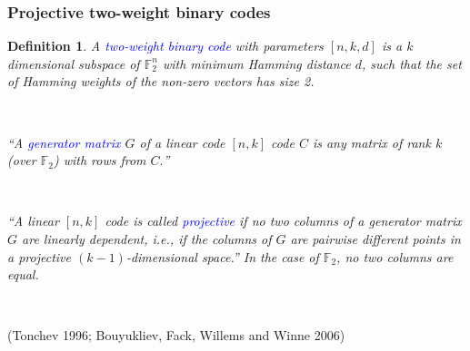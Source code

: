 \documentclass[pdf,sprung,slideColor,nocolorBG]{beamer}
\newenvironment{colortheme}[1]{
\def\ProvidesPackageRCS $##1${\relax}
\renewcommand{\ProcessOptions}{\relax}
\makeatletter

\makeatother
}{}
\newcommand{\slidecite}[1]{\tiny{(#1)}\normalsize{}}
\newcommand{\mb}[1]{\mathbb{#1}}
\newcommand{\Emph}[1]{\emph{\textcolor{blue}{#1}}}
\newcommand{\F}{\mb{F}}
\newtheorem{Def}{Definition}
\begin{document}
\begin{colortheme}{seagull}
\begin{frame}
\frametitle{Projective two-weight binary codes}

\begin{Def}
A \Emph{two-weight binary code} with parameters $[n,k,d]$ is a $k$ dimensional subspace of $\F_2^n$
with
minimum Hamming distance $d$, such that the set of Hamming weights of the non-zero vectors has size
2.

~

``A \Emph{generator matrix} $G$ of a linear code $[n, k]$ code $C$ is any matrix
of rank $k$ (over $\F_2$) with rows from $C.$''

~

``A linear $[n, k]$ code is called \Emph{projective} if no two columns of a generator matrix
$G$ are linearly dependent, i.e., if the columns of $G$ are pairwise different points in a
projective $(k-1)$-dimensional space.''
In the case of $\F_2$, no two columns are equal.

~

\end{Def}

\slidecite{Tonchev 1996; Bouyukliev, Fack, Willems and Winne 2006}

\end{frame}
\end{colortheme}
\end{document}
